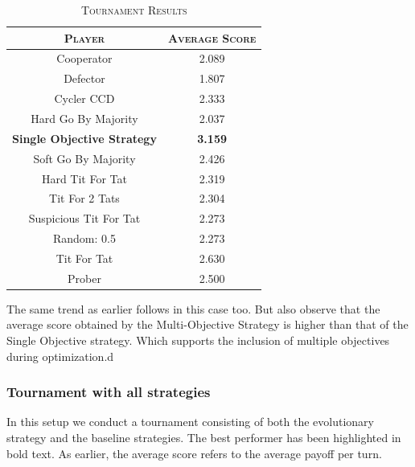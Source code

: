 \documentclass[a4paper]{article}
\begin{document}
	\begin{table}[H]
	  \begin{center}
	    \begin{tabular}{c|c}
	      \toprule
	      \textsc{Player} & \textsc{Average Score}\\
	      \midrule
			Cooperator & 2.089\\
			Defector & 1.807\\
			Cycler CCD & 2.333\\
			Hard Go By Majority & 2.037\\
			\textbf{Single Objective Strategy} & \textbf{3.159}\\
			Soft Go By Majority & 2.426\\
			Hard Tit For Tat & 2.319\\
			Tit For 2 Tats & 2.304\\
			Suspicious Tit For Tat & 2.273\\
			Random: 0.5 & 2.273\\
			Tit For Tat & 2.630\\
			Prober & 2.500\\
		  \bottomrule
	    \end{tabular}
	    \caption{\textsc{Tournament Results}}
	  \end{center}
	\end{table}
	
	The same trend as earlier follows in this case too. But also observe that the average score obtained by the Multi-Objective Strategy is higher than that of the Single Objective strategy. Which supports the inclusion of multiple objectives during optimization.d

	\subsubsection{Tournament with all strategies}
	
In this setup we conduct a tournament consisting of both the evolutionary strategy and the baseline strategies. The best performer has been highlighted in bold text. As earlier, the average score refers to the average payoff per turn.	
	
\end{document}
